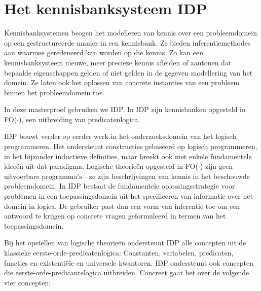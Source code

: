 \section{Het kennisbanksysteem IDP}\label{sec:intro-idp}

Kennisbanksystemen\cite{1999XKSS} beogen het modelleren van kennis over een probleemdomein op een gestructureerde manier in een kennisbank. Ze bieden inferentiemethodes aan waarmee geredeneerd kan worden op die kennis. Zo kan een kennisbanksysteem nieuwe, meer precieze kennis afleiden of aantonen dat bepaalde eigenschappen gelden of niet gelden in de gegeven modellering van het domein. Ze laten ook het oplossen van concrete instanties van een probleem binnen het probleemdomein toe.

In deze masterproef gebruiken we IDP\cite{DeCatBroes2014PLaa}. In IDP zijn kennisbanken opgesteld in FO($\cdot$), een uitbreiding van predicatenlogica.

IDP bouwt verder op eerder werk in het onderzoeksdomein van het logisch programmeren. Het ondersteunt constructies gebaseerd op logisch programmeren, in het bijzonder inductieve definities, maar breekt ook met enkele fundamentele idee\"en uit dat paradigma. Logische theorie\"en opgesteld in FO($\cdot$) zijn geen uitvoerbare programma's---ze zijn beschrijvingen van kennis in het beschouwde probleemdomein. In IDP bestaat de fundamentele oplossingsstrategie voor problemen in een toepassingsdomein uit het specificeren van informatie over het domein in logica. De gebruiker past dan een vorm van inferentie toe om een antwoord te krijgen op concrete vragen geformuleerd in termen van het toepassingsdomein.

Bij het opstellen van logische theorie\"en ondersteunt IDP alle concepten uit de klassieke eerste-orde-predicatenlogica: Constanten, variabelen, predicaten, functies en existenti\"ele en universele kwantoren. IDP ondersteunt ook concepten die eerste-orde-predicantelogica uitbreiden. Concreet gaat het over de volgende vier concepten:

